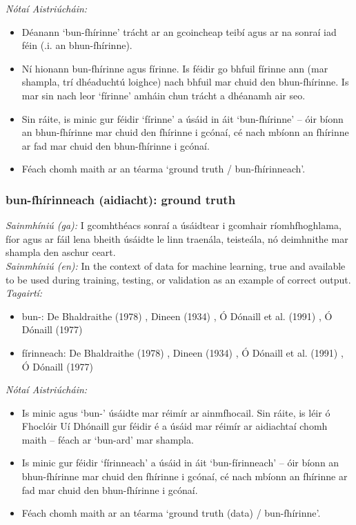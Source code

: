 \documentclass{article}
\begin{document}
 \noindent \textit{Nótaí Aistriúcháin:}
\begin{itemize}
	\item Déanann `bun-fhírinne' trácht ar an gcoincheap teibí agus ar na sonraí iad féin (.i. an bhun-fhírinne). 
	\item Ní hionann bun-fhírinne agus fírinne. Is féidir go bhfuil fírinne ann (mar shampla, trí dhéaduchtú loighce) nach bhfuil mar chuid den bhun-fhírinne. Is mar sin nach leor `fírinne' amháin chun trácht a dhéanamh air seo.
	\item Sin ráite, is minic gur féidir `fírinne' a úsáid in áit `bun-fhírinne' -- óir bíonn an bhun-fhírinne mar chuid den fhírinne i gcónaí, cé nach mbíonn an fhírinne ar fad mar chuid den bhun-fhírinne i gcónaí.
	\item Féach chomh maith ar an téarma `ground truth / bun-fhírinneach'.
\end{itemize}


\subsubsection*{bun-fhírinneach (aidiacht): ground truth}
 \noindent \textit{Sainmhíniú (ga):} I gcomhthéacs sonraí a úsáidtear i gcomhair ríomhfhoghlama, fíor agus ar fáil lena bheith úsáidte le linn traenála, teisteála, nó deimhnithe mar shampla den aschur ceart.
\\
 \noindent \textit{Sainmhíniú (en):} In the context of data for machine learning, true and available to be used during training, testing, or validation as an example of correct output.
\\
 \noindent \textit{Tagairtí:}
\begin{itemize}
	\item bun-: De Bhaldraithe (1978) \cite{de-bhaldraithe}, Dineen (1934) \cite{dineen}, Ó Dónaill et al. (1991) \cite{focloir-beag}, Ó Dónaill (1977) \cite{odonaill}
	\item fírinneach: De Bhaldraithe (1978) \cite{de-bhaldraithe}, Dineen (1934) \cite{dineen}, Ó Dónaill et al. (1991) \cite{focloir-beag}, Ó Dónaill (1977) \cite{odonaill}
\end{itemize}

 \noindent \textit{Nótaí Aistriúcháin:}
\begin{itemize}
	\item Is minic agus `bun-' úsáidte mar réimír ar ainmfhocail. Sin ráite, is léir ó Fhoclóir Uí Dhónaill gur féidir é a úsáid mar réimír ar aidiachtaí chomh maith -- féach ar `bun-ard' mar shampla.
	\item Is minic gur féidir `fírinneach' a úsáid in áit `bun-fírinneach' -- óir bíonn an bhun-fhírinne mar chuid den fhírinne i gcónaí, cé nach mbíonn an fhírinne ar fad mar chuid den bhun-fhírinne i gcónaí.
	\item Féach chomh maith ar an téarma `ground truth (data) / bun-fhírinne'.
\end{itemize}
\end{document}
